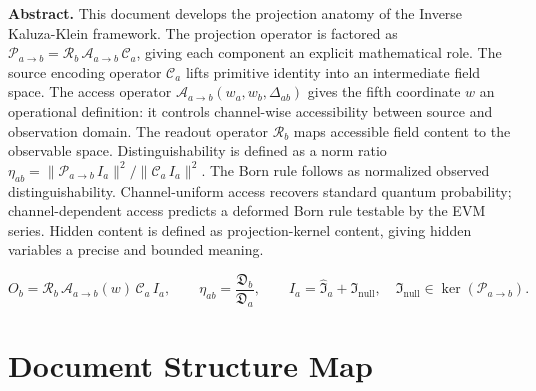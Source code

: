 \documentclass[11pt,a4paper,oneside]{article}
\newcommand{\Ia}{I_a}
\newcommand{\Inull}{\mathfrak{I}_{\mathrm{null}}}
\newcommand{\Ihat}{\widehat{\mathfrak{I}}_a}
\newcommand{\Pab}{\mathcal{P}_{a\to b}}
\newcommand{\Ca}{\mathcal{C}_a}
\newcommand{\Aab}{\mathcal{A}_{a\to b}}
\newcommand{\Rb}{\mathcal{R}_b}
\newcommand{\Da}{\mathfrak{D}_a}
\newcommand{\Db}{\mathfrak{D}_b}
\newcommand{\etaab}{\eta_{ab}}
\newcommand{\wa}{w_a}
\newcommand{\wb}{w_b}
\newcommand{\Dab}{\Delta_{ab}}
\newcommand{\wcoord}{w}
\begin{document}
\textbf{Abstract.} This document develops the projection anatomy of the Inverse Kaluza-Klein framework. The projection operator is factored as $\Pab = \Rb\,\Aab\,\Ca$, giving each component an explicit mathematical role. The source encoding operator $\Ca$ lifts primitive identity into an intermediate field space. The access operator $\Aab(\wa,\wb,\Dab)$ gives the fifth coordinate $\wcoord$ an operational definition: it controls channel-wise accessibility between source and observation domain. The readout operator $\Rb$ maps accessible field content to the observable space. Distinguishability is defined as a norm ratio $\etaab = \|\Pab\,\Ia\|^2/\|\Ca\,\Ia\|^2$. The Born rule follows as normalized observed distinguishability. Channel-uniform access recovers standard quantum probability; channel-dependent access predicts a deformed Born rule testable by the EVM series. Hidden content is defined as projection-kernel content, giving hidden variables a precise and bounded meaning.

\[
\boxed{O_b = \Rb\,\Aab(w)\,\Ca\,\Ia,\qquad \etaab = \frac{\Db}{\Da},\qquad \Ia = \Ihat + \Inull,\quad \Inull \in \ker(\Pab).}
\]

\section{Document Structure Map}
\end{document}
